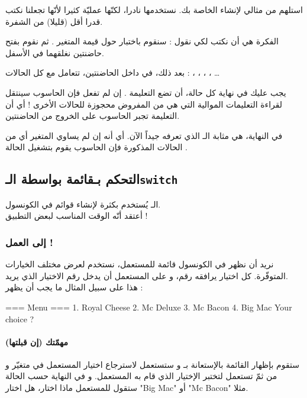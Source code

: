 استلهم من مثالي لإنشاء
الخاصة بك. نستخدمها نادرا، لكنّها عمليّة كثيرا لأنّها تجعلنا نكتب قدرا أقل (قليلا) من الشفرة.

الفكرة هي أن نكتب 
 لكي نقول : سنقوم باختبار حول قيمة المتغير
.
ثم نقوم بفتح حاضنتين نغلقهما في الأسفل.

بعد ذلك، في داخل الحاضنتين، تتعامل مع كل الحالات :
، ، ، ، \dots

يجب عليك في نهاية كل حالة، أن تضع التعليمة 
.
إن لم تفعل فإن الحاسوب سينتقل لقراءة التعليمات الموالية التي هي  من المفروض محجوزة للحالات الأخرى ! أي أن التعليمة 
تجبر الحاسوب على الخروج من الحاضنتين.

في النهاية،
هي مثابة الـ
الذي تعرفه جيداً الآن. أي أنه إن لم يساوي المتغير أي من الحالات المذكورة فإن الحاسوب يقوم بتشغيل الحالة
.

\subsection{التحكم بـقائمة بواسطة الـ\texttt{switch}}

الـ
يُستخدم بكثرة لإنشاء قوائم في الكونسول.\\
أعتقد أنّه الوقت المناسب لبعض التطبيق !

\subsubsection{إلى العمل !}

نريد أن نظهر في الكونسول قائمة للمستعمل، نستخدم
لعرض مختلف الخيارات المتوفّرة. كل اختيار يرافقه رقم، و على المستعمل أن يدخل رقم الاختيار الذي يريد.\\
هذا على سبيل المثال ما يجب أن يظهر :

\begin{Console}
=== Menu ===
1. Royal Cheese
2. Mc Deluxe
3. Mc Bacon
4. Big Mac
Your choice ?
\end{Console}

\paragraph{مهمّتك (إن قبلتها)}
ستقوم بإظهار القائمة بالإستعانة بـ 
و ستستعمل 
لاسترجاع اختيار المستعمل  في متغيّر
و من ثمّ تستعمل
لتختبر الإختيار الذي قام به المستعمل. و في النهاية حسب الحالة ستقول للمستعمل ماذا اختار، هل اختار
"\textenglish{Big Mac}"
أو
"\textenglish{Mc Bacon}"
مثلا.

